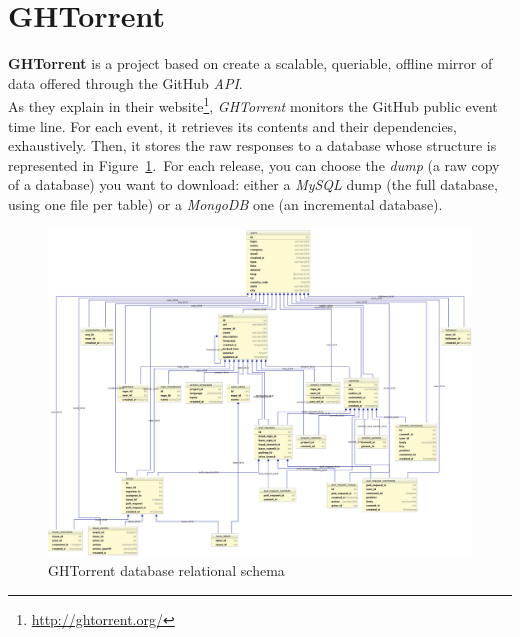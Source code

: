 \documentclass[a4paper, 12pt]{book}
\begin{document}
\section{GHTorrent}
\label{sec:ghtorrent}
\textbf{GHTorrent} is a project based on create a scalable, queriable, offline mirror of data offered through the GitHub \textit{API}.\\
As they explain in their website\footnote{\url{http://ghtorrent.org/}}, \emph{GHTorrent} monitors the GitHub public event time line.
For each event, it retrieves its contents and their dependencies, exhaustively. Then, it stores the raw responses to a database whose
structure is represented in Figure~\ref{fig:ghtorrent-schema}.\
For each release, you can choose the \textit{dump} (a raw copy of a database) you want to download: either a \emph{MySQL} dump
(the full database, using one file per table) or a \emph{MongoDB} one (an incremental database).
\begin{figure}
  \centering
  \includegraphics[width=16cm, keepaspectratio]{img/ghtorrent-schema}
  \caption{GHTorrent database relational schema}
  \label{fig:ghtorrent-schema}
\end{figure}
\end{document}
